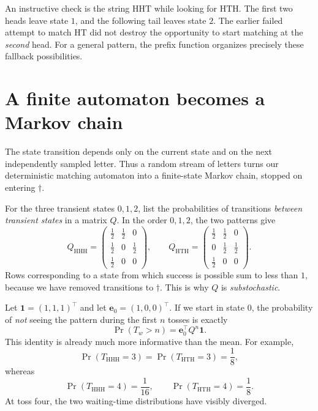 An instructive check is the string \(\mathrm{HHT}\) while looking for \(\mathrm{HTH}\). The first two heads leave state \(1\), and the following tail leaves state \(2\). The earlier failed attempt to match \(\mathrm{HT}\) did not destroy the opportunity to start matching at the \emph{second} head. For a general pattern, the prefix function organizes precisely these fallback possibilities.

\section{A finite automaton becomes a Markov chain}

The state transition depends only on the current state and on the next independently sampled letter. Thus a random stream of letters turns our deterministic matching automaton into a finite-state Markov chain, stopped on entering \(\dagger\).

For the three transient states \(0,1,2\), list the probabilities of transitions \emph{between transient states} in a matrix \(Q\). In the order \(0,1,2\), the two patterns give
\begin{equation}
 Q_{\mathrm{HHH}}=
 \begin{pmatrix}
 \frac12&\frac12&0\\
 \frac12&0&\frac12\\
 \frac12&0&0
 \end{pmatrix},
 \qquad
 Q_{\mathrm{HTH}}=
 \begin{pmatrix}
 \frac12&\frac12&0\\
 0&\frac12&\frac12\\
 \frac12&0&0
 \end{pmatrix}.
 \label{eq:N20261107-twoQ}
\end{equation}
Rows corresponding to a state from which success is possible sum to less than \(1\), because we have removed transitions to \(\dagger\). This is why \(Q\) is \emph{substochastic}.

Let \(\mathbf1=(1,1,1)^\top\) and let \(\mathbf e_0=(1,0,0)^\top\). If we start in state \(0\), the probability of \emph{not} seeing the pattern during the first \(n\) tosses is exactly
\begin{equation}
 \Pr(T_w>n)=\mathbf e_0^\top Q^n\mathbf1.
 \label{eq:N20261107-survivalQ}
\end{equation}
This identity is already much more informative than the mean. For example,
\[
 \Pr(T_{\mathrm{HHH}}=3)
 =\Pr(T_{\mathrm{HTH}}=3)=\frac18,
\]
whereas
\[
 \Pr(T_{\mathrm{HHH}}=4)=\frac1{16},
 \qquad
 \Pr(T_{\mathrm{HTH}}=4)=\frac18.
\]
At toss four, the two waiting-time distributions have visibly diverged.

